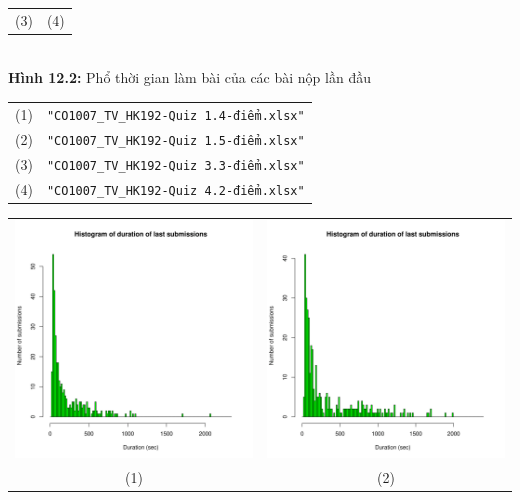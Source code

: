 \documentclass[a4paper]{article}
\theoremstyle{definition}
\begin{document}
\begin{enumerate}[a)]
\begin{itemize}
\begin{center}
\begin{tabular}{c c}
                 (3) & (4)
            \end{tabular}\\
            \textbf{Hình 12.2:} Phổ thời gian làm bài của các bài nộp lần đầu\\
            \begin{tabular}{c c}
                 (1) & \texttt{"CO1007\_TV\_HK192-Quiz 1.4-điểm.xlsx"}\\
                 (2) & \texttt{"CO1007\_TV\_HK192-Quiz 1.5-điểm.xlsx"}\\
                 (3) & \texttt{"CO1007\_TV\_HK192-Quiz 3.3-điểm.xlsx"}\\
                 (4) & \texttt{"CO1007\_TV\_HK192-Quiz 4.2-điểm.xlsx"}
            \end{tabular}
        \end{center}
        \begin{center}
            \begin{tabular}{c c}
                 \includegraphics[width = 6.9cm]{Images/img12-3-1.png} & \includegraphics[width = 6.9cm]{Images/img12-3-2.png} \\
                 (1) & (2) \\

\end{tabular}
\end{center}
\end{itemize}
\end{enumerate}
\end{document}
